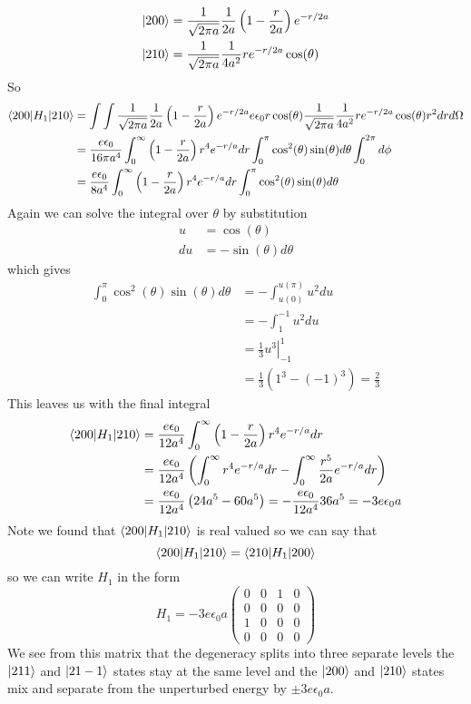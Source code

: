 \documentclass[11pt]{article}
\numberwithin{equation}{section}
\begin{document}
\begin{enumerate}[(a)]
\begin{align*}
|{200}\rangle &= \frac{1}{\sqrt{2\pi a}}\frac{1}{2a}\left(1-\frac{r}{2a}\right)e^{-r/2a}\\
|{210}\rangle &= \frac{1}{\sqrt{2\pi a}}\frac{1}{4a^2}re^{-r/2a}\cos(\theta)
\end{align*}
So
\begin{align*}
\langle{200}|H_1|{210}\rangle &= 
\int\int\frac{1}{\sqrt{2\pi a}}\frac{1}{2a}\left(1-\frac{r}{2a}\right)e^{-r/2a}e\epsilon_0r\cos(\theta)\frac{1}{\sqrt{2\pi a}}\frac{1}{4a^2}re^{-r/2a}\cos(\theta)r^2drd\Omega\\
&= \frac{e\epsilon_0}{16\pi a^4}\int_0^{\infty}\left(1-\frac{r}{2a}\right)r^4e^{-r/a}dr\int_0^{\pi}\cos^2(\theta)\sin(\theta)d\theta\int_{0}^{2\pi}d\phi\\
&= \frac{e\epsilon_0}{8a^4}\int_0^{\infty}\left(1-\frac{r}{2a}\right)r^4e^{-r/a}dr\int_0^{\pi}\cos^2(\theta)\sin(\theta)d\theta
\end{align*}
Again we can solve the integral over $\theta$ by substitution
\begin{align*}
u &= \cos(\theta)\\
du &= -\sin(\theta)d\theta
\end{align*}
which gives
\begin{align*}
\int_0^{\pi}\cos^2(\theta)\sin(\theta)d\theta &= -\int_{u(0)}^{u(\pi)}u^2du\\
&= -\int_{1}^{-1}u^2du\\
&= \left.\frac{1}{3}u^3\right|_{-1}^{1}\\
&= \frac{1}{3}(1^3-(-1)^3) = \frac{2}{3}
\end{align*}
This leaves us with the final integral
\begin{align*}
\langle{200}|H_1|{210}\rangle &= \frac{e\epsilon_0}{12a^4}\int_0^{\infty}\left(1-\frac{r}{2a}\right)r^4e^{-r/a}dr\\
&= \frac{e\epsilon_0}{12a^4}\left(\int_0^{\infty}r^4e^{-r/a}dr-\int_{0}^{\infty}\frac{r^5}{2a}e^{-r/a}dr\right)\\
&= \frac{e\epsilon_0}{12a^4}\left(24a^5-60a^5\right) = -\frac{e\epsilon_0}{12a^4}36a^5 = -3e\epsilon_0a
\end{align*}
Note we found that $\langle{200}|H_1|{210}\rangle$ is real valued so we can say that 
$$\langle{200}|H_1|{210}\rangle = \langle{210}|H_1|{200}\rangle$$
so we can write $H_1$ in the form
$$H_1 = -3e\epsilon_0 a\left(\begin{array}{cccc}
        0   &0   &1   &0\\
        0   &0   &0   &0\\
        1   &0   &0   &0\\
        0   &0   &0   &0
                        \end{array}\right)$$
We see from this matrix that the degeneracy splits into three separate levels the $|{211}\rangle$ and $|{21-1}\rangle$ states stay at the same level and the $|{200}\rangle$ and $|{210}\rangle$ states mix and separate from the unperturbed energy by $\pm3e\epsilon_0a$.


\end{enumerate}
\end{document}
